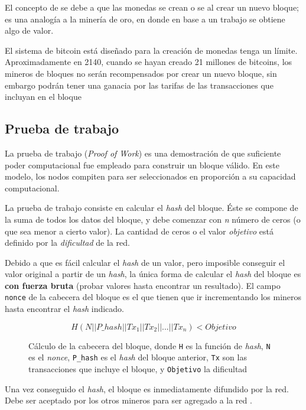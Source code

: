 El concepto de  se debe a que las monedas se crean o se  al crear un nuevo bloque; es una analogía a la minería de oro, en donde en base a un trabajo se obtiene algo de valor.

El sistema de bitcoin está diseñado para la creación de monedas tenga un límite. Aproximadamente en 2140, cuando se hayan creado 21 millones de bitcoins, los mineros de bloques 
no serán recompensados por crear un nuevo bloque, sin embargo podrán tener una ganacia por las tarifas de las transacciones que incluyan en el bloque \autocite{MasteringBlockchainMining}

\subsection{Prueba de trabajo}

La prueba de trabajo (\emph{Proof of Work}) es una demostración de que suficiente poder computacional fue empleado para construir un bloque válido. En este modelo, los nodos compiten para ser seleccionados en proporción a su capacidad computacional.

La prueba de trabajo consiste en calcular el \emph{hash} del bloque. Éste se compone de la suma de todos los datos del bloque, y debe comenzar con \emph{n} número de ceros (o que sea menor a cierto valor). La cantidad de ceros o el valor \emph{objetivo} está definido por la \emph{dificultad} de la red.     

Debido a que es fácil calcular el \emph{hash} de un valor, pero imposible conseguir el valor original a partir de un \emph{hash}, la única forma de calcular el \emph{hash} del bloque es \textbf{con fuerza bruta} (probar valores hasta encontrar un resultado). El campo \texttt{nonce} de la cabecera del bloque es el que tienen que ir incrementando los mineros hasta encontrar el \emph{hash} indicado.

\begin{figure}[H]
    \centering
    \[ H(N || P\_hash|| Tx_1 || Tx_2 || ... || Tx_n) < Objetivo \]
    \caption*{Cálculo de la cabecera del bloque, donde \texttt{H} es la función de \emph{hash}, \texttt{N} es el \emph{nonce}, \texttt{P\_hash} es el \emph{hash} del bloque anterior, \texttt{Tx} son las transacciones que incluye el bloque, y \texttt{Objetivo} la dificultad}
\end{figure}

Una vez conseguido el \emph{hash}, el bloque es inmediatamente difundido por la red. Debe ser aceptado por los otros mineros para ser agregado a la red \autocite{MasteringBlockchainProofOfWork}. 

